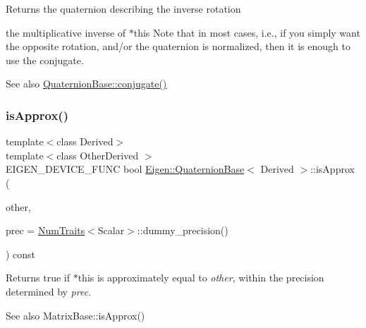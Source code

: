 \begin{DoxyReturn}{Returns}
the quaternion describing the inverse rotation

the multiplicative inverse of {\ttfamily $\ast$this} Note that in most cases, i.\+e., if you simply want the opposite rotation, and/or the quaternion is normalized, then it is enough to use the conjugate.
\end{DoxyReturn}
\begin{DoxySeeAlso}{See also}
\mbox{\hyperlink{class_eigen_1_1_quaternion_base_aa82dabadce488031c298a5a0a92cda14}{Quaternion\+Base\+::conjugate()}} 
\end{DoxySeeAlso}
\mbox{\label{class_eigen_1_1_quaternion_base_a83c9e817b726fb798d3f2e15002a4241}} 
\subsubsection{\texorpdfstring{isApprox()}{isApprox()}}
{\footnotesize\ttfamily template$<$class Derived$>$ \\
template$<$class Other\+Derived $>$ \\
E\+I\+G\+E\+N\+\_\+\+D\+E\+V\+I\+C\+E\+\_\+\+F\+U\+NC bool \mbox{\hyperlink{class_eigen_1_1_quaternion_base}{Eigen\+::\+Quaternion\+Base}}$<$ Derived $>$\+::is\+Approx (\begin{DoxyParamCaption}\item[{const \mbox{\hyperlink{class_eigen_1_1_quaternion_base}{Quaternion\+Base}}$<$ Other\+Derived $>$ \&}]{other,  }\item[{const Real\+Scalar \&}]{prec = {\ttfamily \mbox{\hyperlink{struct_eigen_1_1_num_traits}{Num\+Traits}}$<$Scalar$>$\+:\+:dummy\+\_\+precision()} }\end{DoxyParamCaption}) const\hspace{0.3cm}{\ttfamily [inline]}}

\begin{DoxyReturn}{Returns}
{\ttfamily true} if {\ttfamily $\ast$this} is approximately equal to {\itshape other}, within the precision determined by {\itshape prec}.
\end{DoxyReturn}
\begin{DoxySeeAlso}{See also}
Matrix\+Base\+::is\+Approx() 
\end{DoxySeeAlso}
\mbox{\label{class_eigen_1_1_quaternion_base_a3c317a676ccae923a9c4a5e80019be17}} 
